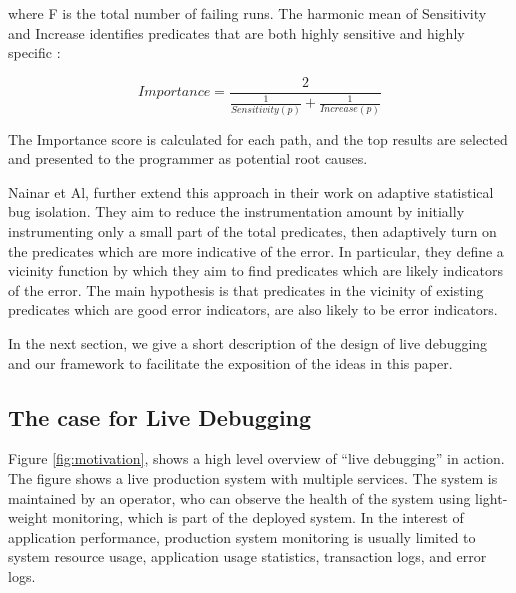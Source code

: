 where F is the total number of failing runs. The harmonic mean of Sensitivity and Increase identifies predicates that are both highly sensitive and highly specific :

\begin{equation}
\label{eq:importance}
Importance = \frac{2}{\frac{1}{Sensitivity(p)}+\frac{1}{Increase(p)}}
\end{equation}

The Importance score is calculated for each path, and the top results are selected and presented to the programmer as potential root causes.

Nainar et Al\cite{}, further extend this approach in their work on adaptive statistical bug isolation.
They aim to reduce the instrumentation amount by initially instrumenting only a small part of the total predicates, then adaptively turn on the predicates which are more indicative of the error.
In particular, they define a vicinity function by which they aim to find predicates which are likely indicators of the error.
The main hypothesis is that predicates in the vicinity of existing predicates which are good error indicators, are also likely to be error indicators.

In the next section, we give a short description of the design of live debugging and our \parikshan framework to facilitate the exposition of the ideas in this paper. 

\subsection{The case for Live Debugging}
\label{sec:case}

Figure \ref{fig:motivation}, shows a high level overview of ``live debugging'' in action. 
The figure shows a live production system with multiple services. 
The system is maintained by an operator, who can observe the health of the system using light-weight monitoring, which is part of the deployed system. 
In the interest of application performance, production system monitoring is usually limited to system resource usage, application usage statistics, transaction logs, and error logs.

